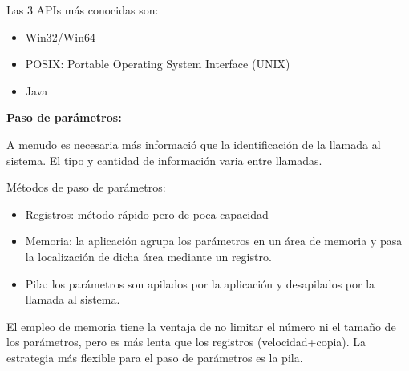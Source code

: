 \documentclass{article}
\begin{document}
Las 3 APIs más conocidas son:
\begin{itemize}
\item Win32/Win64

\item POSIX: Portable Operating System Interface (UNIX)

\item Java
\end{itemize}

\textbf{Paso de parámetros:}

A menudo es necesaria más informació que la identificación de la llamada al sistema. El tipo y cantidad de información varia entre llamadas.

Métodos de paso de parámetros:
\begin{itemize}
\item Registros: método rápido pero de poca capacidad

\item Memoria: la aplicación agrupa los parámetros en un área de memoria y pasa la localización de dicha área mediante un registro.

\item Pila: los parámetros son apilados por la aplicación y desapilados por la llamada al sistema.
\end{itemize}

El empleo de memoria tiene la ventaja de no limitar el número ni el tamaño de los parámetros, pero es más lenta que los registros (velocidad+copia). La estrategia más flexible para el paso de parámetros es la pila.
\end{document}
